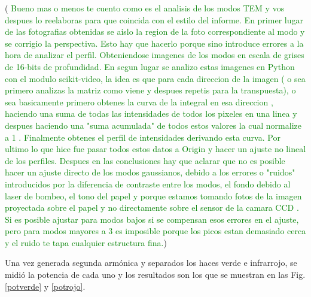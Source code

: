 \documentclass[10pt, a4paper]{article}%
\begin{document}
\begin{multicols}{2}
(\textcolor{Green}{ Bueno mas o menos te cuento como es el analisis de los modos TEM y vos despues lo reelaboras para que coincida con el estilo del informe. \newline En primer lugar de las fotografias obtenidas se aislo la region de la foto correspondiente al modo y se corrigio la perspectiva. Esto hay que hacerlo porque sino introduce errores a la hora de analizar el perfil. Obteniendose imagenes de los modos en escala de grises de 16-bits de profundidad. En segun lugar se analizo estas imagenes en Python con el modulo scikit-video, la idea es que para cada direccion de la imagen ( o sea primero analizas la matriz como viene y despues repetis para la transpuesta), o sea basicamente primero obtenes la curva de la integral en esa direccion , haciendo una suma de todas las intensidades de todos los pixeles en una linea y despues haciendo una "suma acumulada" de todos estos valores la cual normalize a 1 . Finalmente obtenes el perfil de intensidades derivando esta curva. Por ultimo lo que hice fue pasar todos estos datos a Origin y hacer un ajuste no lineal de los perfiles. Despues en las conclusiones hay que aclarar que no es posible hacer un ajuste directo de los modos gaussianos, debido a los errores o "ruidos" introducidos por la diferencia de contraste entre los modos, el fondo debido al laser de bombeo, el tono del papel y porque estamos tomando fotos de la imagen proyectada sobre el papel y no directamente sobre el sensor de la camara CCD . Si es posible ajustar para modos bajos si se compensan esos errores en el ajuste, pero para modos mayores a 3 es imposible porque los picos estan demasiado cerca y el ruido te tapa cualquier estructura fina.})


Una vez generada segunda armónica y separados los haces verde e infrarrojo, se midió la potencia de cada uno y los resultados son los que se muestran en las Fig. \ref{potverde} y \ref{potrojo}. 



\end{multicols}
\end{document}
